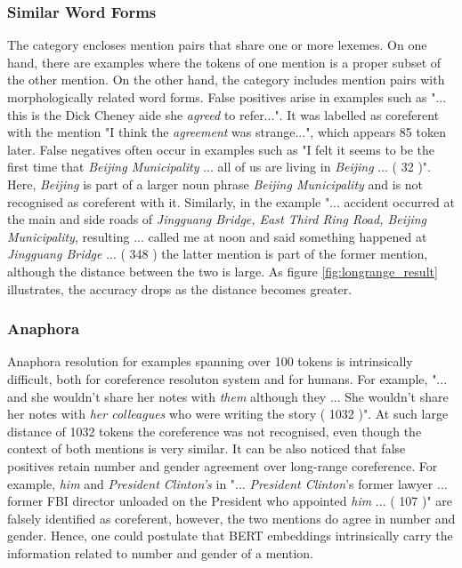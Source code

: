 \documentclass[11pt]{article}
\begin{document}
\subsubsection{Similar Word Forms} 
The category encloses mention pairs that share one or more lexemes. On one hand, there are examples where the tokens of one mention is a proper subset of the other mention. On the other hand, the category includes mention pairs with morphologically related word forms.
False positives arise in examples such as "... this is the Dick Cheney aide she \textit{agreed} to refer...". It was labelled as coreferent with the mention "I think the \textit{agreement} was strange...", which appears 85 token later. 
False negatives often occur in examples such as "I felt it seems to be the first time that \textit{Beijing Municipality} ... all of us are living in \textit{Beijing} ... ( 32 )". Here, \textit{Beijing} is part of a larger noun phrase \textit{Beijing Municipality} and is not recognised as coreferent with it. Similarly, in the example "... accident occurred at the main and side roads of \textit{Jingguang Bridge, East Third Ring Road, Beijing Municipality}, resulting ... called me at noon and said something happened at \textit{Jingguang Bridge} ... ( 348 ) the latter mention is part of the former mention, although the distance between the two is large. As figure \ref{fig:longrange_result} illustrates, the accuracy drops as the distance becomes greater.

\subsubsection{Anaphora}

Anaphora resolution for examples spanning over 100 tokens is intrinsically difficult, both for coreference resoluton system and for humans. For example, "... and she wouldn't share her notes with \textit{them} although they ... She wouldn't share her notes with \textit{her colleagues} who were writing the story ( 1032 )". At such large distance of 1032 tokens the coreference was not recognised, even though the context of both mentions is very similar. It can be also noticed that false positives retain number and gender agreement over long-range coreference. For example, \textit{him} and \textit{President Clinton's} in "... \textit{President Clinton}'s former lawyer ... former FBI director unloaded on the President who appointed \textit{him} ... ( 107 )" are falsely identified as coreferent, however, the two mentions do agree in number and gender. Hence, one could postulate that BERT embeddings intrinsically carry the information related to number and gender of a mention. 
\end{document}
